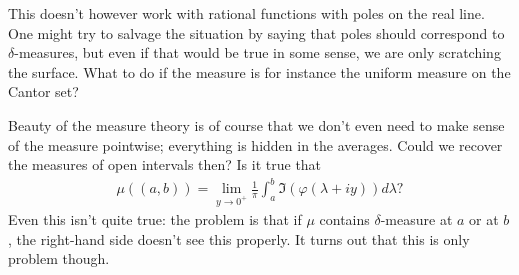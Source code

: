 This doesn't however work with rational functions with poles on the real line. One might try to salvage the situation by saying that poles should correspond to $\delta$-measures, but even if that would be true in some sense, we are only scratching the surface. What to do if the measure is for instance the uniform measure on the Cantor set?

Beauty of the measure theory is of course that we don't even need to make sense of the measure pointwise; everything is hidden in the averages. Could we recover the measures of open intervals then? Is it true that
\begin{align*}
	\mu((a, b)) = \lim_{y \to 0^{+}}\frac{1}{\pi}\int_{a}^{b} \Im(\varphi(\lambda + i y)) d \lambda?
\end{align*}
Even this isn't quite true: the problem is that if $\mu$ contains $\delta$-measure at $a$ or at $b$, the right-hand side doesn't see this properly. It turns out that this is only problem though.


